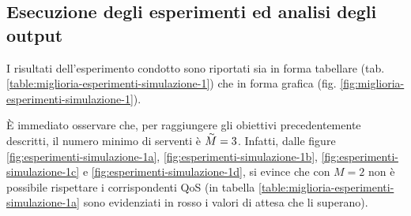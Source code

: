 \subsection{Esecuzione degli esperimenti ed analisi degli output}
I risultati dell'esperimento condotto sono riportati sia in forma tabellare (tab. \ref{table:miglioria-esperimenti-simulazione-1}) che in forma grafica (fig. \ref{fig:miglioria-esperimenti-simulazione-1}).

È immediato osservare che, per raggiungere gli obiettivi precedentemente descritti, il numero minimo di serventi è $\accentset{\sim}{M} = 3$. Infatti, dalle figure \ref{fig:esperimenti-simulazione-1a}, \ref{fig:esperimenti-simulazione-1b}, \ref{fig:esperimenti-simulazione-1c} e \ref{fig:esperimenti-simulazione-1d}, si evince che con $M = 2$ non è possibile rispettare i corrispondenti QoS (in tabella \ref{table:miglioria-esperimenti-simulazione-1a} sono evidenziati in {\color{red}rosso} i valori di attesa che li superano).

